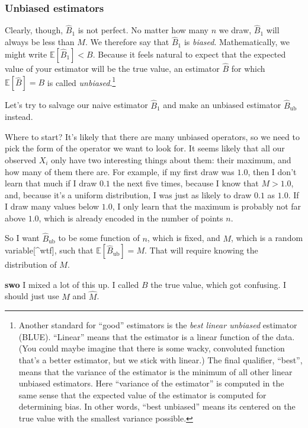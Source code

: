 \subsubsection{Unbiased estimators}\label{unbiased-estimators}

Clearly, though, \(\hat{B}_1\) is not perfect. No matter how many \(n\)
we draw, \(\hat{B}_1\) will always be less than \(M\). We therefore say
that \(\hat{B}_1\) is \emph{biased}. Mathematically, we might write
\(\mathbb{E}[\hat{B}_1] < B\). Because it feels natural to expect that
the expected value of your estimator will be the true value, an
estimator \(\hat{B}\) for which \(\mathbb{E}[\hat{B}] = B\) is called
\emph{unbiased}.\footnote{Another standard for ``good'' estimators is
  the \emph{best linear unbiased} estimator (BLUE). ``Linear'' means
  that the estimator is a linear function of the data. (You could maybe
  imagine that there is some wacky, convoluted function that's a better
  estimator, but we stick with linear.) The final qualifier, ``best'',
  means that the variance of the estimator is the minimum of all other
  linear unbiased estimators. Here ``variance of the estimator'' is
  computed in the same sense that the expected value of the estimator is
  computed for determining bias. In other words, ``best unbiased'' means
  its centered on the true value with the smallest variance possible.}

Let's try to salvage our naive estimator \(\hat{B}_1\) and make an
unbiased estimator \(\hat{B}_\mathrm{ub}\) instead.

Where to start? It's likely that there are many unbiased operators, so
we need to pick the form of the operator we want to look for. It seems
likely that all our observed \(X_i\) only have two interesting things
about them: their maximum, and how many of them there are. For example,
if my first draw was \(1.0\), then I don't learn that much if I draw
\(0.1\) the next five times, because I know that \(M > 1.0\), and,
because it's a uniform distribution, I was just as likely to draw
\(0.1\) as \(1.0\). If I draw many values below \(1.0\), I only learn
that the maximum is probably not far above \(1.0\), which is already
encoded in the number of points \(n\).

So I want \(\hat{B}_\mathrm{ub}\) to be some function of \(n\), which is
fixed, and \(M\), which is a random variable{[}\^{}wtf{]}, such that
\(\mathbb{E}[\hat{B}_\mathrm{ub}] = M\). That will require knowing the
distribution of \(M\).

\textbf{swo} I mixed a lot of this up. I called \(B\) the true value,
which got confusing. I should just use \(M\) and \(\hat{M}\).


